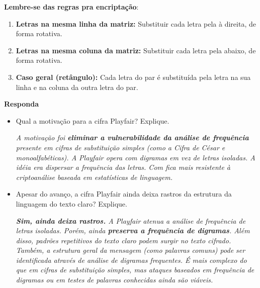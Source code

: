 \textbf{Lembre-se das regras pra encriptação}:
\begin{enumerate}
    
    \item \textbf{Letras na mesma linha da matriz:} Substituir cada letra pela à direita, de forma rotativa.  
  
    
    \item \textbf{Letras na mesma coluna da matriz:} Substituir cada letra pela abaixo, de forma rotativa.
    
    \item \textbf{Caso geral (retângulo):} Cada letra do par é substituída pela letra na sua linha e na coluna da outra letra do par.  

\begin{itemize}
    \item Separando as letras:  }
    \item Texto cifrado: \boxed{\text{AGMVMKQYQBYTMAQBPM}}
\end{itemize}


\end{enumerate}

\textbf{Responda}
\begin{itemize}
    \item Qual a motivação para a cifra Playfair? Explique.

    \textit{A motivação foi \textbf{eliminar a vulnerabilidade da análise de frequência} presente em cifras de substituição simples (como a Cifra de César e monoalfabéticas). A Playfair opera com digramas em vez de letras isoladas. A idéia era dispersar a frequência das letras. Com fica mais resistente à criptoanálise baseada em estatísticas de linguagem. 
}

    \item Apesar do avanço, a cifra Playfair ainda deixa rastros da estrutura da linguagem do texto claro? Explique.

    \textit{\textbf{Sim, ainda deixa rastros.} A Playfair atenua a análise de frequência de letras isoladas. Porém, ainda \textbf{preserva a frequência de digramas}. Além disso, padrões repetitivos do texto claro podem surgir no texto cifrado. Também, a estrutura geral da mensagem (como palavras comuns) pode ser identificada através de análise de digramas frequentes. É mais complexo do que em cifras de substituição simples, mas ataques baseados em frequência de digramas ou em testes de palavras conhecidas ainda são viáveis.}
\end{itemize}

